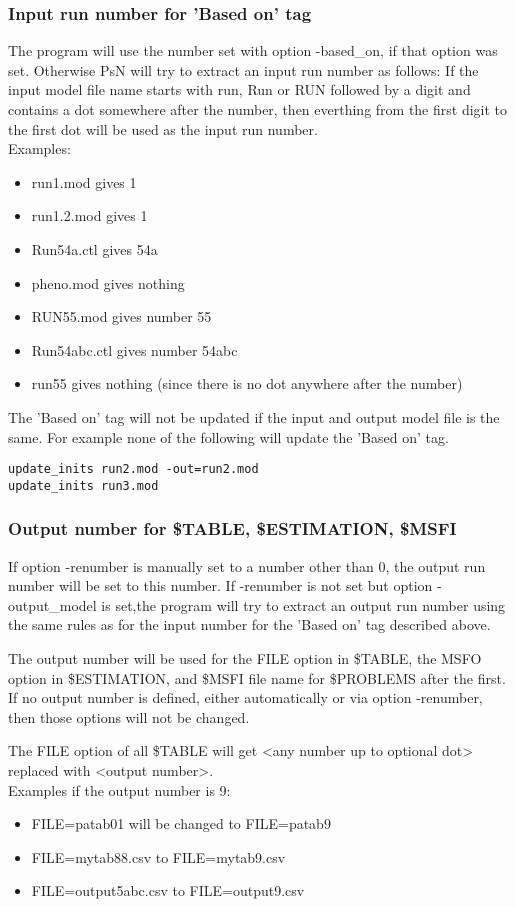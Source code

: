 \subsubsection*{Input run number for 'Based on' tag}
The program will use the number set with option -based\_on, if that option was set. Otherwise PsN will try to extract an input run number as follows: If the input model file name starts with run, Run or RUN followed by a digit and contains a dot somewhere after the number, then everthing from the first digit to the first dot will be used as the input run number.\\
Examples:
\begin{itemize}
\item run1.mod gives 1
\item run1.2.mod gives 1
\item Run54a.ctl gives 54a
\item pheno.mod gives nothing
\item RUN55.mod gives number 55
\item Run54abc.ctl gives number 54abc
\item run55 gives nothing (since there is no dot anywhere after the number)
\end{itemize}
The 'Based on' tag will not be updated if the input and output model file is the same. For example none of the following will update the 'Based on' tag.
\begin{verbatim}
update_inits run2.mod -out=run2.mod
update_inits run3.mod
\end{verbatim}

\subsubsection*{Output number for \$TABLE, \$ESTIMATION, \$MSFI}
If option -renumber is manually set to a number other than 0, the output run number will be set to this number. If -renumber is not set but option -output\_model is set,the program will try to extract an output run number using the same rules as for the input number for the 'Based on' tag described above.

The output number will be used for the FILE option in \$TABLE, the MSFO option in \$ESTIMATION, and \$MSFI file name for \$PROBLEMS after the first. If no output number is defined, either automatically or via option -renumber, then those options will not be changed.

The FILE option of all \$TABLE will get <any number up to optional dot> replaced with <output number>.\\
Examples if the output number is 9:
\begin{itemize}
\item FILE=patab01 will be changed to FILE=patab9
\item FILE=mytab88.csv to FILE=mytab9.csv
\item FILE=output5abc.csv to FILE=output9.csv
\end{itemize}

